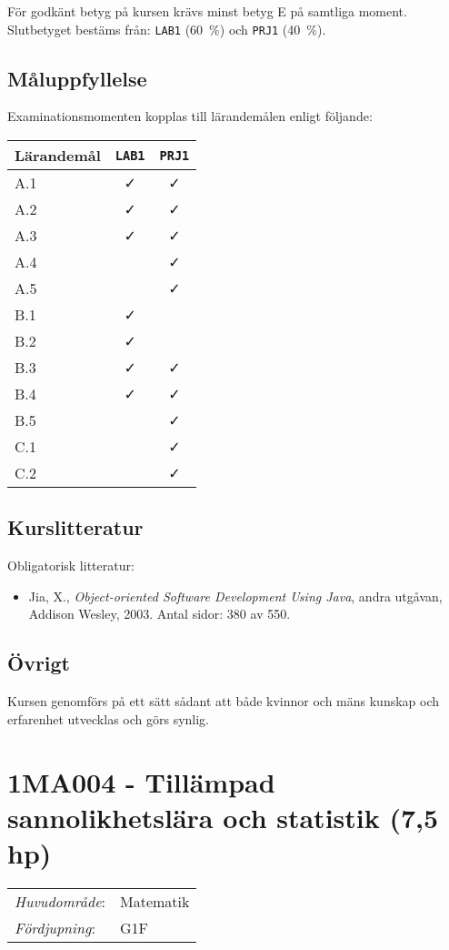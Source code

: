 För godkänt betyg på kursen krävs minst betyg E på samtliga moment.
Slutbetyget bestäms från: \texttt{LAB1} (60~\%) och \texttt{PRJ1} (40~\%).

\subsection*{Måluppfyllelse}

Examinationsmomenten kopplas till lärandemålen enligt följande:

\begin{longtable}[]{@{}lcc@{}}
\toprule
\textsf{Lärandemål} & \texttt{LAB1} & \texttt{PRJ1}\tabularnewline
\midrule
\endhead
A.1 & \faCheck & \faCheck\tabularnewline
A.2 & \faCheck & \faCheck\tabularnewline
A.3 & \faCheck & \faCheck\tabularnewline
A.4 & & \faCheck\tabularnewline
A.5 & & \faCheck\tabularnewline
B.1 & \faCheck &\tabularnewline
B.2 & \faCheck &\tabularnewline
B.3 & \faCheck & \faCheck\tabularnewline
B.4 & \faCheck & \faCheck\tabularnewline
B.5 & & \faCheck\tabularnewline
C.1 & & \faCheck\tabularnewline
C.2 & & \faCheck\tabularnewline
\bottomrule
\end{longtable}

\subsection*{Kurslitteratur}

Obligatorisk litteratur:

\begin{itemize}
\tightlist
\item
  Jia, X., \emph{Object-oriented Software Development Using Java}, andra
  utgåvan, Addison Wesley, 2003. Antal sidor: 380 av 550.
\end{itemize}

\subsection*{Övrigt}

Kursen genomförs på ett sätt sådant att både kvinnor och mäns kunskap och erfarenhet utvecklas och görs synlig.
\pagebreak
\section*{1MA004 - Tillämpad sannolikhetslära och statistik (7,5 hp)}

\begin{tabular}{ll}\emph{Huvudområde}: & Matematik\tabularnewline\emph{Fördjupning}: & G1F\tabularnewline\end{tabular}

